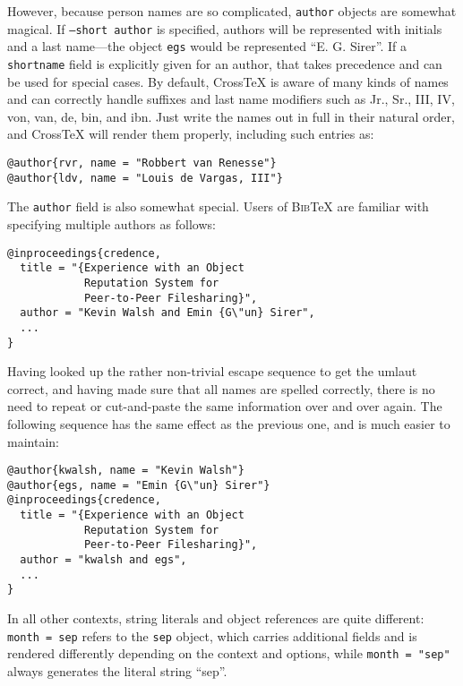 \documentclass{article}
\newcommand{\XTX}{Cross\TeX}
\newcommand{\BibTeX}{\textsc{Bib}\TeX}
\begin{document}
However, because person names are so complicated, \texttt{author}
objects are somewhat magical. If \texttt{--short author} is specified,
authors will be represented with initials and a last name---the object
\texttt{egs} would be represented ``E. G. Sirer''. If a \texttt{shortname}
field is explicitly given for an author, that takes precedence and can
be used for special cases.  By default, \XTX{} is aware of many kinds of
names and can correctly handle suffixes and last name modifiers such as
Jr., Sr., III, IV, von, van, de, bin, and ibn. Just write the names out
in full in their natural order, and \XTX{} will render them properly,
including such entries as:

\begin{small}\begin{verbatim}
@author{rvr, name = "Robbert van Renesse"}
@author{ldv, name = "Louis de Vargas, III"}
\end{verbatim}\end{small}

The \texttt{author} field is also somewhat special. Users of \BibTeX{}
are familiar with specifying multiple authors as follows:

\begin{small}\begin{verbatim}
@inproceedings{credence,
  title = "{Experience with an Object
            Reputation System for 
            Peer-to-Peer Filesharing}",
  author = "Kevin Walsh and Emin {G\"un} Sirer",
  ...
}
\end{verbatim}\end{small}

Having looked up the rather non-trivial escape sequence to get the umlaut
correct, and having made sure that all names are spelled correctly, there
is no need to repeat or cut-and-paste the same information over and over
again. The following sequence has the same effect as the previous one,
and is much easier to maintain:

\begin{small}\begin{verbatim}
@author{kwalsh, name = "Kevin Walsh"}
@author{egs, name = "Emin {G\"un} Sirer"}
@inproceedings{credence,
  title = "{Experience with an Object
            Reputation System for 
            Peer-to-Peer Filesharing}",
  author = "kwalsh and egs",
  ...
}
\end{verbatim}\end{small}

In all other contexts, string literals and object references are quite
different: \texttt{month = sep} refers to the \texttt{sep} object, which
carries additional fields and is rendered differently depending on the
context and options, while \texttt{month = "sep"} always generates the
literal string ``sep''.
\end{document}
